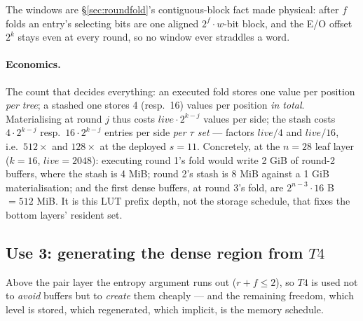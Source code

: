 \documentclass[11pt]{article}
\theoremstyle{definition}
\begin{document}
The windows are \S\ref{sec:roundfold}'s contiguous-block fact made
physical: after $f$ folds an entry's selecting bits are one aligned
$2^{f}{\cdot}w$-bit block, and the E/O offset $2^k$ stays even at
every round, so no window ever straddles a word.

\paragraph{Economics.}
The count that decides everything: an executed fold stores one value
per position \emph{per tree}; a stashed one stores 4 (resp.\ 16)
values per position \emph{in total}.  Materialising at round $j$ thus
costs $\mathit{live}\cdot 2^{k-j}$ values per side; the stash costs
$4\cdot 2^{k-j}$ resp.\ $16\cdot 2^{k-j}$
entries per side \emph{per $\tau$ set} --- factors $\mathit{live}/4$
and $\mathit{live}/16$, i.e.\ $512\times$ and $128\times$ at the
deployed $s = 11$.  Concretely, at the $n = 28$ leaf layer ($k = 16$,
$\mathit{live} = 2048$): executing round 1's fold would write 2 GiB of
round-2 buffers, where the stash is 4 MiB; round 2's stash is 8 MiB
against a 1 GiB materialisation; and the first dense buffers, at
round 3's fold, are $2^{n-3}\cdot 16$ B $= 512$ MiB.  It is this LUT
prefix depth, not the storage schedule, that fixes the bottom layers'
resident set.

\subsection{Use 3: generating the dense region from $T4$}
\label{sec:jit}

Above the pair layer the entropy argument runs out ($r + f \le 2$), so
$T4$ is used not to \emph{avoid} buffers but to \emph{create} them
cheaply --- and the remaining freedom, which level is stored, which
regenerated, which implicit, is the memory schedule.
\end{document}
